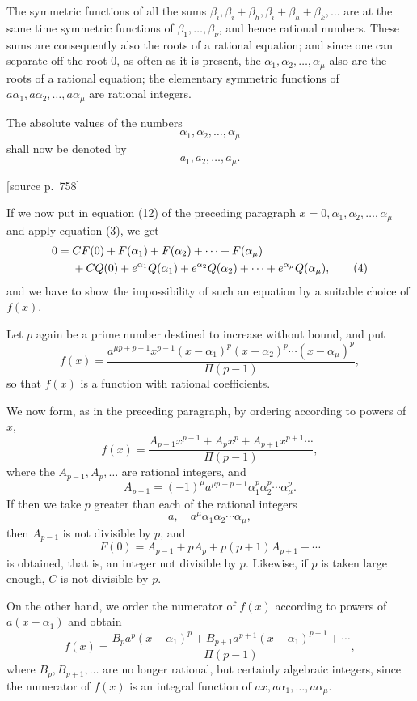 \documentclass[11pt]{article}
\newcommand{\srcpage}[1]{\par\medskip\noindent\textsf{[source p.~#1]}\par\smallskip}
\begin{document}
The symmetric functions of all the sums $\beta_i,\beta_i+\beta_h,\beta_i+\beta_h+\beta_k,\ldots$ are at the same time symmetric functions of $\beta_1,\ldots,\beta_\nu$, and hence rational numbers. These sums are consequently also the roots of a rational equation; and since one can separate off the root 0, as often as it is present, the $\alpha_1,\alpha_2,\ldots,\alpha_\mu$ also are the roots of a rational equation; the elementary symmetric functions of $a\alpha_1,a\alpha_2,\ldots,a\alpha_\mu$ are rational integers.

The absolute values of the numbers
\[
\alpha_1,\alpha_2,\ldots,\alpha_\mu
\]
shall now be denoted by
\[
a_1,a_2,\ldots,a_\mu .
\]

\srcpage{758}
If we now put in equation (12) of the preceding paragraph $x=0,\alpha_1,\alpha_2,\ldots,\alpha_\mu$ and apply equation (3), we get
\begin{align}
0={}&CF(0)+F(\alpha_1)+F(\alpha_2)+\cdots+F(\alpha_\mu)\notag\\
&+CQ(0)+e^{\alpha_1}Q(\alpha_1)+e^{\alpha_2}Q(\alpha_2)+\cdots+e^{\alpha_\mu}Q(\alpha_\mu),
\tag{4}
\end{align}
and we have to show the impossibility of such an equation by a suitable choice of $f(x)$.

Let $p$ again be a prime number destined to increase without bound, and put
\begin{equation}\tag{5}
f(x)=
\frac{a^{\mu p+p-1}x^{p-1}(x-\alpha_1)^p(x-\alpha_2)^p\cdots(x-\alpha_\mu)^p}{\Pi(p-1)},
\end{equation}
so that $f(x)$ is a function with rational coefficients.

We now form, as in the preceding paragraph, by ordering according to powers of $x$,
\[
f(x)=\frac{A_{p-1}x^{p-1}+A_px^p+A_{p+1}x^{p+1}\cdots}{\Pi(p-1)},
\]
where the $A_{p-1},A_p,\ldots$ are rational integers, and
\[
A_{p-1}=(-1)^\mu a^{\mu p+p-1}\alpha_1^p\alpha_2^p\cdots\alpha_\mu^p.
\]
If then we take $p$ greater than each of the rational integers
\[
a,\quad a^\mu\alpha_1\alpha_2\cdots\alpha_\mu,
\]
then $A_{p-1}$ is not divisible by $p$, and
\[
F(0)=A_{p-1}+pA_p+p(p+1)A_{p+1}+\cdots
\]
is obtained, that is, an integer not divisible by $p$. Likewise, if $p$ is taken large enough, $C$ is not divisible by $p$.

On the other hand, we order the numerator of $f(x)$ according to powers of $a(x-\alpha_1)$ and obtain
\[
f(x)=\frac{B_pa^p(x-\alpha_1)^p+B_{p+1}a^{p+1}(x-\alpha_1)^{p+1}+\cdots}{\Pi(p-1)},
\]
where $B_p,B_{p+1},\ldots$ are no longer rational, but certainly algebraic integers, since the numerator of $f(x)$ is an integral function of $ax,a\alpha_1,\ldots,a\alpha_\mu$.
\end{document}
